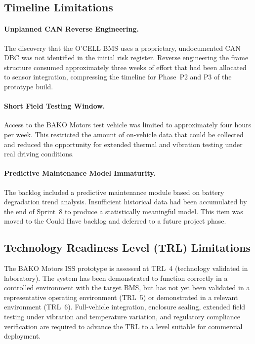 \subsection{Timeline Limitations}

\paragraph{Unplanned CAN Reverse Engineering.}
The discovery that the O'CELL BMS uses a proprietary, undocumented CAN DBC was not identified in the initial risk register. Reverse engineering the frame structure consumed approximately three weeks of effort that had been allocated to sensor integration, compressing the timeline for Phase~P2 and P3 of the prototype build.

\paragraph{Short Field Testing Window.}
Access to the BAKO Motors test vehicle was limited to approximately four hours per week. This restricted the amount of on-vehicle data that could be collected and reduced the opportunity for extended thermal and vibration testing under real driving conditions.

\paragraph{Predictive Maintenance Model Immaturity.}
The backlog included a predictive maintenance module based on battery degradation trend analysis. Insufficient historical data had been accumulated by the end of Sprint~8 to produce a statistically meaningful model. This item was moved to the Could Have backlog and deferred to a future project phase.

\subsection{Technology Readiness Level (TRL) Limitations}

The BAKO Motors ISS prototype is assessed at TRL~4 (technology validated in laboratory). The system has been demonstrated to function correctly in a controlled environment with the target BMS, but has not yet been validated in a representative operating environment (TRL~5) or demonstrated in a relevant environment (TRL~6). Full-vehicle integration, enclosure sealing, extended field testing under vibration and temperature variation, and regulatory compliance verification are required to advance the TRL to a level suitable for commercial deployment.
